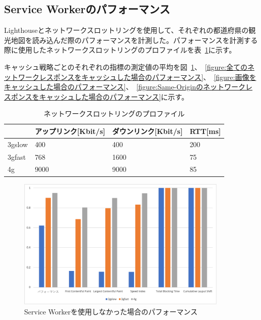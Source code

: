 \subsection{Service Workerのパフォーマンス}\label{subsubsection:Service Workerのパフォーマンス}
Lighthouseとネットワークスロットリングを使用して、それぞれの都道府県の観光地図を読み込んだ際のパフォーマンスを計測した。パフォーマンスを計測する際に使用したネットワークスロットリングのプロファイルを表~\ref{table:ネットワークスロットリングのプロファイル}に示す。

キャッシュ戦略ごとのそれぞれの指標の測定値の平均を図~\ref{figure:Service Workerを使用しなかった場合のパフォーマンス}、~\ref{figure:全てのネットワークレスポンスをキャッシュした場合のパフォーマンス}、~\ref{figure:画像をキャッシュした場合のパフォーマンス}、~\ref{figure:Same-Originのネットワークレスポンスをキャッシュした場合のパフォーマンス}に示す。

\begin{table}
  \caption{ネットワークスロットリングのプロファイル}\label{table:ネットワークスロットリングのプロファイル}
  \centering
  \begin{tabular}{|p{5em}|p{10em}|p{10em}|p{10em}|}
    \hline
    & アップリンク[Kbit/s] & ダウンリンク[Kbit/s] & RTT[ms] \\ \hline
    3gslow & 400 & 400 & 200 \\ \hline
    3gfast & 768 & 1600 & 75 \\ \hline
    4g & 9000 & 9000 & 85 \\ \hline
  \end{tabular}
\end{table}

\begin{figure}
  \centering
  \includegraphics[width=0.9\textwidth]{images/without_service_worker.png}
  \caption{Service Workerを使用しなかった場合のパフォーマンス}\label{figure:Service Workerを使用しなかった場合のパフォーマンス}
\end{figure}

